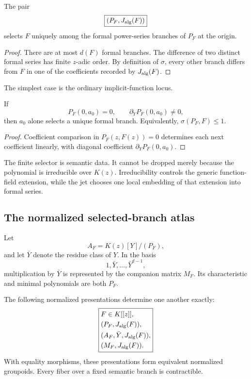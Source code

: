\begin{theorem}
\label{thm:block10-finite-branch-separation}
The pair
\[
 \boxed{(P_F,J_{\rm alg}(F))}
\]
selects $F$ uniquely among the formal power-series branches of $P_F$ at the origin.
\end{theorem}

\begin{proof}
There are at most $d(F)$ formal branches.  The difference of two distinct formal series has finite $z$-adic order.  By definition of $\sigma$, every other branch differs from $F$ in one of the coefficients recorded by $J_{\rm alg}(F)$.
\end{proof}

The simplest case is the ordinary implicit-function locus.

\begin{corollary}
\label{cor:block10-simple-branch}
If
\[
 P_F(0,a_0)=0,
 \qquad
 \partial_Y P_F(0,a_0)\neq0,
\]
then $a_0$ alone selects a unique formal branch.  Equivalently, $\sigma(P_F,F)\leq1$.
\end{corollary}

\begin{proof}
Coefficient comparison in $P_F(z,F(z))=0$ determines each next coefficient linearly, with diagonal coefficient $\partial_Y P_F(0,a_0)$.
\end{proof}

The finite selector is semantic data.  It cannot be dropped merely because the polynomial is irreducible over $K(z)$.  Irreducibility controls the generic function-field extension, while the jet chooses one local embedding of that extension into formal series.

\subsection{The normalized selected-branch atlas}
\label{subsec:block10-branch-atlas}

Let
\[
 A_F=K(z)[Y]/(P_F),
\]
and let $\bar Y$ denote the residue class of $Y$.  In the basis
\[
 1,\bar Y,\ldots,\bar Y^{d-1},
\]
multiplication by $\bar Y$ is represented by the companion matrix $M_F$.  Its characteristic and minimal polynomials are both $P_F$.

\begin{theorem}
\label{thm:block10-branch-atlas}
The following normalized presentations determine one another exactly:
\[
 \boxed{
 \begin{aligned}
 &F\in K[[z]],\\
 &(P_F,J_{\rm alg}(F)),\\
 &(A_F,\bar Y,J_{\rm alg}(F)),\\
 &(M_F,J_{\rm alg}(F)).
 \end{aligned}}
\]
With equality morphisms, these presentations form equivalent normalized groupoids.  Every fiber over a fixed semantic branch is contractible.
\end{theorem}

